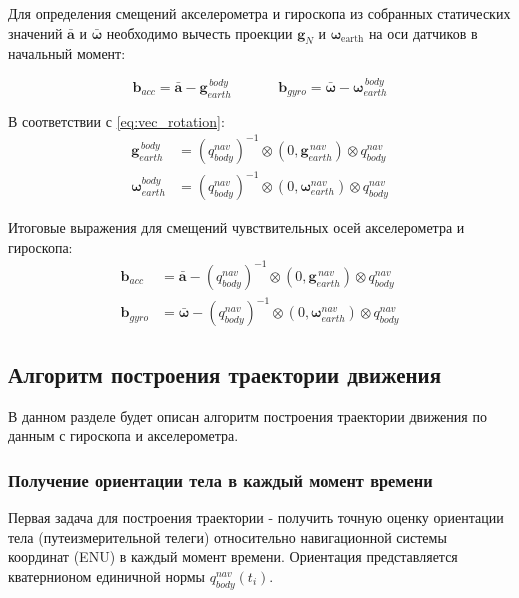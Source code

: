 Для определения смещений акселерометра и гироскопа из собранных статических значений $\bm{\bar{a}}$ и $\bm{\bar{\omega}}$ необходимо вычесть проекции $\bm{g}_{N}$ и $\bm{\omega}_{\text{earth}}$ на оси датчиков в начальный момент:

\begin{equation*}
	\bm{b}_{acc} = \bm{\bar{a}} - \bm{g}_{earth}^{\hspace{2pt} body}				\hspace{40pt} 
	\bm{b}_{gyro} = \bm{\bar{\omega}} - \bm{\omega}_{earth}^{\hspace{2pt} body} 
\end{equation*}

В соответствии с \eqref{eq:vec_rotation}:
\begin{align*}
	\bm{g}_{earth}^{\hspace{2pt} body} &= \left( q_{body}^{nav} \right)^{-1} \otimes 
		\left( 0, \bm{g}_{earth}^{\hspace{2pt} nav} \right) \otimes q_{body}^{nav}	\\
	\bm{\omega}_{earth}^{body} &= \left( q_{body}^{nav} \right)^{-1} \otimes 
		\left( 0, \bm{\omega}_{earth}^{nav} \right) \otimes q_{body}^{nav}	
\end{align*}

Итоговые выражения для смещений чувствительных осей акселерометра и гироскопа:
\begin{align}
	\bm{b}_{acc} &= \bm{\bar{a}} - \left( q_{body}^{nav} \right)^{-1} \otimes 
		\left( 0, \bm{g}_{earth}^{\hspace{2pt} nav} \right) \otimes q_{body}^{nav}		\label{eq:bias_acc} \\
	\bm{b}_{gyro} &= \bm{\bar{\omega}} - \left( q_{body}^{nav} \right)^{-1} \otimes 
		\left( 0, \bm{\omega}_{earth}^{nav} \right) \otimes q_{body}^{nav}				\label{eq:bias_gyro}
\end{align}



\subsection{Алгоритм построения траектории движения}
В данном разделе будет описан алгоритм построения траектории движения по данным с гироскопа и акселерометра.

\subsubsection{Получение ориентации тела в каждый момент времени}
Первая задача для построения траектории - получить точную оценку ориентации тела (путеизмерительной телеги) относительно навигационной системы координат (ENU) в каждый момент времени. Ориентация представляется кватернионом единичной нормы $q_{body}^{nav}(t_i)$.

